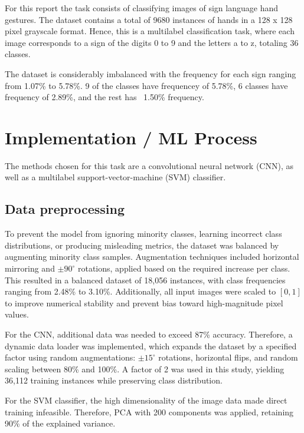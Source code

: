\documentclass[a4, 10 pt, conference]{ieeeconf}  %
\begin{document}
For this report the task consists of classifying images of sign language hand gestures.
The dataset contains a total of 9680 instances of hands in a 128 x 128 pixel grayscale format.
Hence, this is a multilabel classification task, where each image corresponds to a
sign of the digits 0 to 9 and the letters a to z, totaling 36 classes.

The dataset is considerably imbalanced with the frequency for each sign ranging from
1.07\% to 5.78\%. 9 of the classes have frequencey of 5.78\%, 6 classes have
frequency of 2.89\%, and the rest has ~1.50\% frequency.

\section{Implementation / ML Process}
\label{sec:methods}

The methods chosen for this task are a convolutional neural network (CNN), as
well as a multilabel support-vector-machine (SVM) classifier.

\subsection{Data preprocessing}
\label{subsec:preprocessing}

To prevent the model from ignoring minority classes, learning incorrect class distributions, or producing misleading metrics, the dataset was balanced by augmenting minority class samples. Augmentation techniques included horizontal mirroring and $\pm90^\circ$ rotations, applied based on the required increase per class. This resulted in a balanced dataset of 18{,}056 instances, with class frequencies ranging from 2.48\% to 3.10\%.
Additionally, all input images were scaled to $[0, 1]$ to improve numerical stability and prevent bias toward high-magnitude pixel values.

For the CNN, additional data was needed to exceed 87\% accuracy. Therefore, a dynamic data loader was implemented, which expands the dataset by a specified factor using random augmentations: $\pm15^\circ$ rotations, horizontal flips, and random scaling between 80\% and 100\%. A factor of 2 was used in this study, yielding 36{,}112 training instances while preserving class distribution.

For the SVM classifier, the high dimensionality of the image data made direct training infeasible. Therefore, PCA with 200 components was applied, retaining 90\% of the explained variance.
\end{document}
